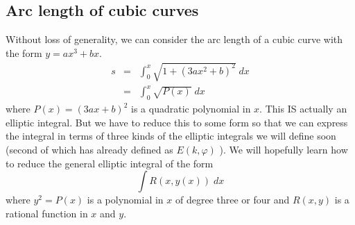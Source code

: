 \documentclass{article}
\begin{document}
\subsection{Arc length of cubic curves}
\label{sec-2-4}
Without loss of generality, we can consider the arc length of a cubic curve with the form $y = ax^{3} + bx$.
\begin{eqnarray}
s &=&  \int_{0}^{x} \sqrt{ 1  + ( 3a x^{2} + b)^{2}} \; dx \\ \nonumber
  &=& \int_{0}^{x} \sqrt{P(x)} \; dx
\end{eqnarray}
where $P(x) = (3ax +b)^{2}$ is a quadratic polynomial in $x$. This IS actually an elliptic integral. 
But we have to reduce this to some form so that we can express the integral in terms of three kinds of the elliptic integrals we will define soon (second of which has already defined as $E(k,\varphi)$ ).
We will hopefully learn how to reduce the general elliptic integral of the form
\begin{equation}
\int R(x, y(x)) \; dx
\end{equation}
where $y^{2} = P(x)$ is a polynomial in $x$ of degree three or four and $R(x,y)$ is a rational function in $x$ and $y$.
\end{document}
